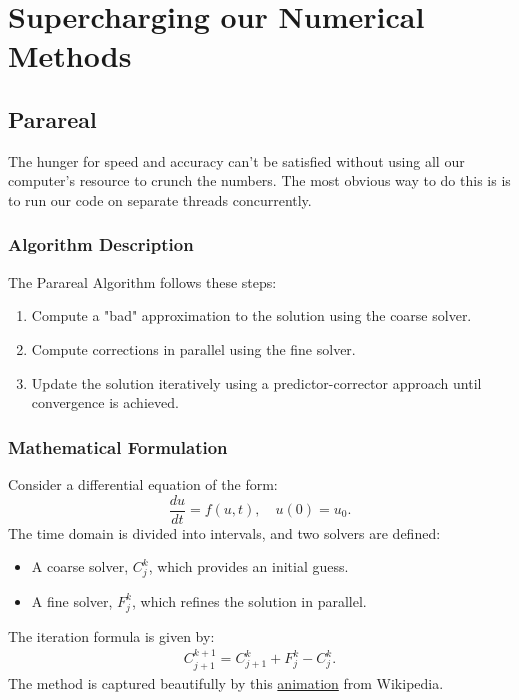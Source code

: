 
\chapter{Supercharging our Numerical Methods}

\label{Chapter5} %

\section{Parareal}
    The hunger for speed and accuracy can't be satisfied without using all our computer's resource to crunch the numbers. The most obvious way to do this is is to run our code on separate threads concurrently. 
    
\subsection{Algorithm Description}
The Parareal Algorithm follows these steps:
\begin{enumerate}
    \item Compute a "bad" approximation to the solution using the coarse solver.
    \item Compute corrections in parallel using the fine solver.
    \item Update the solution iteratively using a predictor-corrector approach until convergence is achieved.
\end{enumerate}

\subsection{Mathematical Formulation}
Consider a differential equation of the form:
\begin{equation}
    \frac{du}{dt} = f(u,t), \quad u(0) = u_0.
\end{equation}
The time domain is divided into intervals, and two solvers are defined:
\begin{itemize}
    \item A coarse solver, $C_j^k$, which provides an initial guess.
    \item A fine solver, $F_j^k$, which refines the solution in parallel.
\end{itemize}
The iteration formula is given by:
\begin{align*}
    C_{j+1}^{k+1} = C_{j+1}^k + F_j^k - C_j^k.
\end{align*}
The method is captured beautifully by this 
\href{https://upload.wikimedia.org/wikipedia/commons/transcoded/b/b5/Parareal_Animation.ogv/Parareal_Animation.ogv.720p.vp9.webm}{animation} from Wikipedia.
